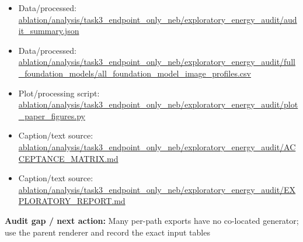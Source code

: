 \documentclass[10pt]{article}
\newcommand{\statusline}[1]{\colorbox{gray!12}{\parbox{0.96\linewidth}{#1}}}
\begin{document}
\begin{itemize}[leftmargin=1.4em,noitemsep]
\item Data/processed: \begingroup\scriptsize\url{ablation/analysis/task3_endpoint_only_neb/exploratory_energy_audit/audit_summary.json}\endgroup
\item Data/processed: \begingroup\scriptsize\url{ablation/analysis/task3_endpoint_only_neb/exploratory_energy_audit/full_foundation_models/all_foundation_model_image_profiles.csv}\endgroup
\item Plot/processing script: \begingroup\scriptsize\url{ablation/analysis/task3_endpoint_only_neb/exploratory_energy_audit/plot_paper_figures.py}\endgroup
\item Caption/text source: \begingroup\scriptsize\url{ablation/analysis/task3_endpoint_only_neb/exploratory_energy_audit/ACCEPTANCE_MATRIX.md}\endgroup
\item Caption/text source: \begingroup\scriptsize\url{ablation/analysis/task3_endpoint_only_neb/exploratory_energy_audit/EXPLORATORY_REPORT.md}\endgroup
\end{itemize}
\statusline{\textbf{Audit gap / next action:} Many per-path exports have no co-located generator; use the parent renderer and record the exact input tables}
\vfill
\clearpage
\end{document}
